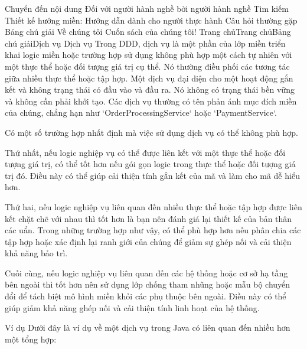




Chuyển đến nội dung
Đối với người hành nghề bởi người hành nghề
Tìm kiếm
Thiết kế hướng miền: Hướng dẫn dành cho người thực hành
Câu hỏi thường gặp
Bảng chú giải
Về chúng tôi
Cuốn sách của chúng tôi!
Trang chủTrang chủBảng chú giảiDịch vụ
Dịch vụ
Trong DDD, dịch vụ là một phần của lớp miền triển khai logic miền hoặc trường hợp sử dụng không phù hợp một cách tự nhiên với một thực thể hoặc đối tượng giá trị cụ thể. Nó thường điều phối các tương tác giữa nhiều thực thể hoặc tập hợp. Một dịch vụ đại diện cho một hoạt động gắn kết và không trạng thái có đầu vào và đầu ra. Nó không có trạng thái bền vững và không cần phải khởi tạo. Các dịch vụ thường có tên phản ánh mục đích miền của chúng, chẳng hạn như `OrderProcessingService` hoặc `PaymentService`.

Có một số trường hợp nhất định mà việc sử dụng dịch vụ có thể không phù hợp.

Thứ nhất, nếu logic nghiệp vụ có thể được liên kết với một thực thể hoặc đối tượng giá trị, có thể tốt hơn nếu gói gọn logic trong thực thể hoặc đối tượng giá trị đó. Điều này có thể giúp cải thiện tính gắn kết của mã và làm cho mã dễ hiểu hơn.

Thứ hai, nếu logic nghiệp vụ liên quan đến nhiều thực thể hoặc tập hợp được liên kết chặt chẽ với nhau thì tốt hơn là bạn nên đánh giá lại thiết kế của bản thân các uẩn. Trong những trường hợp như vậy, có thể phù hợp hơn nếu phân chia các tập hợp hoặc xác định lại ranh giới của chúng để giảm sự ghép nối và cải thiện khả năng bảo trì.

Cuối cùng, nếu logic nghiệp vụ liên quan đến các hệ thống hoặc cơ sở hạ tầng bên ngoài thì tốt hơn nên sử dụng lớp chống tham nhũng hoặc mẫu bộ chuyển đổi để tách biệt mô hình miền khỏi các phụ thuộc bên ngoài. Điều này có thể giúp giảm khả năng ghép nối và cải thiện tính linh hoạt của hệ thống.

Ví dụ
Dưới đây là ví dụ về một dịch vụ trong Java có liên quan đến nhiều hơn một tổng hợp:

